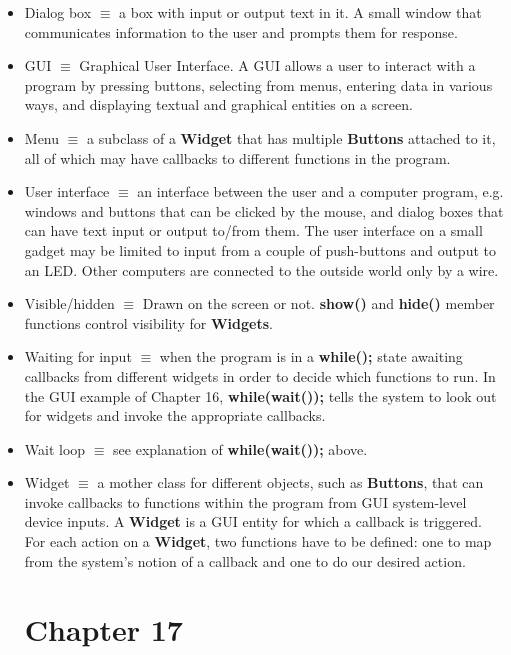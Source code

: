 \documentclass[12pt]{article}
\begin{document}
\begin{itemize}
\item Dialog box $\equiv$ a box with input or output text in it. A small window that communicates information to the user and prompts them for response.

\item GUI $\equiv$ Graphical User Interface. A GUI allows a user to interact with a program by pressing buttons, selecting from menus, entering data in various ways, and displaying textual and graphical entities on a screen.

\item Menu $\equiv$ a subclass of a \textbf{Widget} that has multiple \textbf{Buttons} attached to it, all of which may have callbacks to different functions in the program.

\item User interface $\equiv$ an interface between the user and a computer program, e.g. windows and buttons that can be clicked by the mouse, and dialog boxes that can have text input or output to/from them. The user interface on a small gadget may be limited to input from a couple of push-buttons and output to an LED. Other computers are connected to the outside world only by a wire.

\item Visible/hidden $\equiv$ Drawn on the screen or not. \textbf{show()} and \textbf{hide()} member functions control visibility for \textbf{Widgets}.

\item Waiting for input $\equiv$ when the program is in a \textbf{while();} state awaiting callbacks from different widgets in order to decide which functions to run. In the GUI example of Chapter 16, \textbf{while(wait());} tells the system to look out for widgets and invoke the appropriate callbacks.

\item Wait loop $\equiv$ see explanation of \textbf{while(wait());} above.

\item Widget $\equiv$ a mother class for different objects, such as \textbf{Buttons}, that can invoke callbacks to functions within the program from GUI system-level device inputs. A \textbf{Widget} is a GUI entity for which a callback is triggered. For each action on a \textbf{Widget}, two functions have to be defined: one to map from the system's notion of a callback and one to do our desired action.


\section*{Chapter 17}


\end{itemize}
\end{document}

